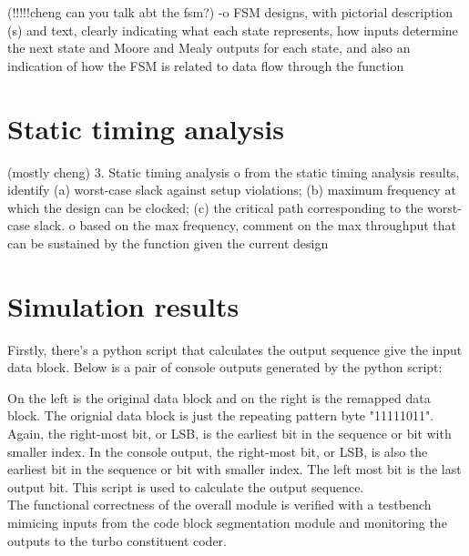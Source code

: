 \documentclass[letterpaper]{article} %
\begin{document}
(!!!!!cheng can you talk abt the fsm?)
-o  FSM designs, with pictorial description (s)
            and text, clearly indicating what each state
            represents, how inputs determine the next state and Moore and Mealy
            outputs for each state, and also an indication of how the FSM is
            related to data flow through the function


\section{Static timing analysis}
(mostly cheng)
    3.  Static timing analysis
		 o  from the static timing analysis results, identify (a) worst-case slack
		 	against setup violations;  (b) maximum frequency at which the design
			can be clocked;  (c) the critical path corresponding to the worst-case
			slack.
		 o	based on the max frequency, comment on the max throughput that can
		 	be sustained by the function given the current design



\section{Simulation results}

Firstly, there's a python script that calculates the output sequence give the input data block. Below is a pair of console outputs generated by the python script:

\begin{minipage}{.49\textwidth}
\centering
{}
\centering
\end{minipage}
\begin{minipage}{.49\textwidth}
\centering
{}
\centering
\end{minipage}
\bigskip

On the left is the original data block and on the right is the remapped data block. The orignial data block is just the repeating pattern byte "11111011". Again, the right-most bit, or LSB, is the earliest bit in the sequence or bit with smaller index. In the console output, the right-most bit, or LSB, is also the earliest bit in the sequence or bit with smaller index. The left most bit is the last output bit. This script is used to calculate the output sequence.\\

The functional correctness of the overall module is verified with a testbench mimicing inputs from the code block segmentation module and monitoring the outputs to the turbo constituent coder.\\ 
\end{document}

